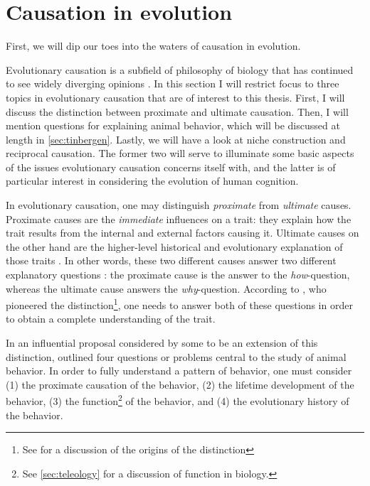 \section{Causation in evolution}
\label{sec:causation-evolution}

First, we will dip our toes into the waters of causation in evolution.

Evolutionary causation is a subfield of philosophy of biology that has continued to see widely diverging opinions \citep{Baedke2021, UllerLaland19}. In this section I will restrict focus to three topics in evolutionary causation that are of interest to this thesis. First, I will discuss the distinction between proximate and ultimate causation. Then, I will mention  questions for explaining animal behavior, which will be discussed at length in \cref{sec:tinbergen}. Lastly, we will have a look at niche construction and reciprocal causation.
The former two will serve to illuminate some basic aspects of the issues evolutionary causation concerns itself with, and the latter is of particular interest in considering the evolution of human cognition.

In evolutionary causation, one may distinguish \emph{proximate} from \emph{ultimate} causes.
Proximate causes are the \emph{immediate} influences on a trait: they explain how the trait results from the internal and external factors causing it.
Ultimate causes on the other hand are the higher-level historical and evolutionary explanation of those traits \citep{Mayr61}. In other words, these two different causes answer two different explanatory questions : the proximate cause is the answer to the \emph{how}-question, whereas the ultimate cause answers the \emph{why}-question. According to \citet{Mayr61}, who pioneered the distinction\footnote{See \citep{Laland13} for a discussion of the origins of the distinction}, one needs to answer both of these questions in order to obtain a complete understanding of the trait.

In an influential proposal considered by some  to be an extension of this distinction, \citet{Tinbergen63} outlined four questions or problems central to the study of animal behavior. In order to fully understand a pattern of behavior, one must consider (1) the proximate causation of the behavior, (2) the lifetime development of the behavior, (3) the function\footnote{See \cref{sec:teleology} for a discussion of function in biology.} of the behavior, and (4) the evolutionary history of the behavior.

